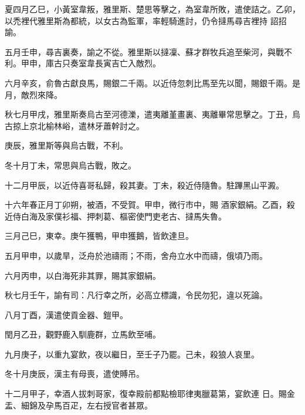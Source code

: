 \begin{pinyinscope}
 夏四月乙巳，小黃室韋叛，雅里斯、楚思等擊之，為室韋所敗，遣使詰之。乙卯，以禿裡代雅里斯為都統，以女古為監軍，率輕騎進討，仍令撻馬尋吉裡持
 詔招諭。



 五月壬申，尋吉裏奏，諭之不從。雅里斯以撻凜、蘇才群牧兵追至柴河，與戰不利。甲申，庫古只奏室韋長寅吉亡入敵烈。



 六月辛亥，俞魯古獻良馬，賜銀二千兩。以近侍忽刺比馬至先以聞，賜銀千兩。是月，敵烈來降。



 秋七月甲戌，雅里斯奏烏古至河德濼，遣夷離堇畫裏、夷離畢常思擊之。丁丑，烏古掠上京北榆林峪，遣林牙蕭幹討之。



 庚辰，雅里斯等與烏古戰，不利。



 冬十月丁未，常思與烏古戰，敗之。



 十二月甲辰，以近侍喜哥私歸，殺其妻。丁未，殺近侍隨魯。駐蹕黑山平澱。



 十六年春正月丁卯朔，被酒，不受賀。甲申，微行市中，賜
 酒家銀絹。乙酉，殺近侍白海及家僕衫福、押刺葛、樞密使門吏老古、撻馬失魯。



 三月己巳，東幸。庚午獲鴨，甲申獲鵝，皆飲達旦。



 五月甲申，以歲旱，泛舟於池禱雨；不雨，舍舟立水中而禱，俄頃乃雨。



 六月丙申，以白海死非其罪，賜其家銀絹。



 秋七月壬午，諭有司：凡行幸之所，必高立標識，令民勿犯，違以死論。



 八月丁酉，漢遣使貢金器、鎧甲。



 閏月乙丑，觀野鹿入馴鹿群，立馬飲至哺。



 九月庚子，以重九宴飲，夜以繼日，至壬子乃罷。己未，殺狼人哀里。



 冬十月庚辰，漢主有母喪，遣使賻吊。



 十二月甲子，幸酒人拔刺哥家，復幸殿前都點檢耶律夷臘葛第，宴飲連
 日。賜金盂、細錦及孕馬百疋，左右授官者甚眾。




\end{pinyinscope}
